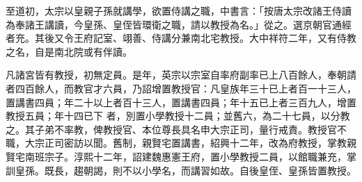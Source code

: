 \begin{pinyinscope}
 至道初，太宗以皇親子孫就講學，欲置侍講之職，中書言：「按唐太宗改諸王侍讀為奉諸王講讀，今皇孫、皇侄皆環衛之職，請以教授為名。」從之。選京朝官通經者充。其後又令王府記室、翊善、侍講分兼南北宅教授。大中祥符二年，又有侍教之名，自是南北院或有伴讀。



 凡諸宮皆有教授，初無定員。是年，英宗以宗室自率府副率已上八百餘人，奉朝請者四百餘人，而教官才六員，乃詔增置教授官：凡皇族年三十已上者百一十三人，置講書四員；年二十以上者百十三人，置講書四員；年十五已上者三百九人，增置教授五員；年十四已下
 者，別置小學教授十二員；並舊六，為二十七員，以分教之。其子弟不率教，俾教授官、本位尊長具名申大宗正司，量行戒責。教授官不職，大宗正司密訪以聞。舊制，親賢宅置講書，紹興十二年，改為府教授，掌教親賢宅南班宗子。淳熙十二年，詔建魏惠憲王府，置小學教授二員，以館職兼充，掌訓皇孫。既長，趨朝謁，則不以小學名，而講習如故。自後皇侄、皇孫皆置教授。



\end{pinyinscope}